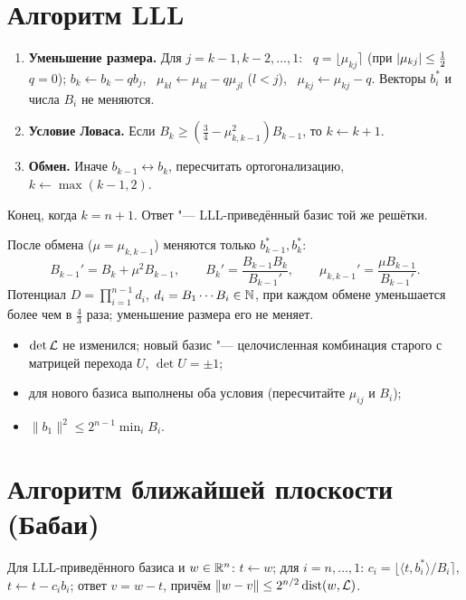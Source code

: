 \documentclass{ca-handout}
\begin{document}
\section{Алгоритм LLL}
\begin{reminder}[title={Один шаг (текущий индекс $k$; в начале $k = 2$)}]
\begin{enumerate}
  \item \textbf{Уменьшение размера.} Для $j = k - 1, k - 2, \dots, 1$: \
    $q = \lfloor \mu_{kj} \rceil$ (при $\lvert\mu_{kj}\rvert \le \frac12$ $q = 0$);
    $b_k \gets b_k - q b_j$, \ $\mu_{kl} \gets \mu_{kl} - q \mu_{jl}$ ($l < j$), \
    $\mu_{kj} \gets \mu_{kj} - q$. Векторы $b_i^*$ и числа $B_i$ не меняются.
  \item \textbf{Условие Ловаса.} Если $B_k \ge (\frac34 - \mu_{k,k-1}^2) B_{k-1}$, то
    $k \gets k + 1$.
  \item \textbf{Обмен.} Иначе $b_{k-1} \leftrightarrow b_k$, пересчитать ортогонализацию,
    $k \gets \max(k - 1, 2)$.
\end{enumerate}
Конец, когда $k = n + 1$. Ответ "--- LLL-приведённый базис той же решётки.
\end{reminder}
После обмена ($\mu = \mu_{k,k-1}$) меняются только $b_{k-1}^*, b_k^*$:
\[
  B_{k-1}' = B_k + \mu^2 B_{k-1}, \qquad B_k' = \frac{B_{k-1} B_k}{B_{k-1}'}, \qquad
  \mu_{k,k-1}' = \frac{\mu B_{k-1}}{B_{k-1}'} .
\]
Потенциал $D = \prod_{i=1}^{n-1} d_i$, $d_i = B_1 \cdots B_i \in \mathbb{N}$, при каждом обмене
уменьшается более чем в $\frac43$ раза; уменьшение размера его не меняет.

\begin{reminder}[title={Проверка ответа}]
\begin{itemize}
  \item $\det \mathcal{L}$ не изменился; новый базис "--- целочисленная комбинация старого с
    матрицей перехода $U$, $\det U = \pm 1$;
  \item для нового базиса выполнены оба условия (пересчитайте $\mu_{ij}$ и $B_i$);
  \item $\|b_1\|^2 \le 2^{n-1} \min_i B_i$.
\end{itemize}
\end{reminder}

\section{Алгоритм ближайшей плоскости (Бабаи)}
Для LLL-приведённого базиса и $w \in \mathbb{R}^n$: $t \gets w$; для $i = n, \dots, 1$:
$c_i = \lfloor \langle t, b_i^*\rangle / B_i \rceil$, $t \gets t - c_i b_i$; ответ
$v = w - t$, причём $\|w - v\| \le 2^{n/2} \operatorname{dist}(w, \mathcal{L})$.
\end{document}

